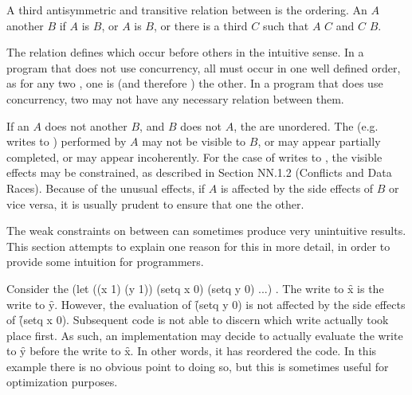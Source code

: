 A third antisymmetric and transitive relation between
 is the  ordering. An
 $A$  another 
$B$ if $A$ is  $B$, or $A$ is
 $B$, or there is a third 
$C$ such that $A$  $C$ and $C$
 $B$.

The  relation defines which 
occur before others in the intuitive sense. In a program that does not
use concurrency, all  must occur in one well defined
order, as for any two , one is
 (and therefore ) the
other. In a program that does use concurrency, two 
may not have any necessary  relation between
them.

If an  $A$ does not  another
 $B$, and $B$ does not  $A$, the
 are unordered. The  (e.g. writes
to ) performed by $A$ may not be visible to $B$, or may
appear partially completed, or may appear incoherently. For the case
of writes to , the visible effects may be constrained, as
described in Section NN.1.2 (Conflicts and Data Races). Because of the
unusual effects, if $A$ is affected by the side effects of $B$ or vice
versa, it is usually prudent to ensure that one 
the other.


The weak constraints on  between  can
sometimes produce very unintuitive results. This section attempts to
explain one reason for this in more detail, in order to provide some
intuition for programmers.

Consider the 
\code
(let ((x 1) (y 1)) (setq x 0) (setq y 0) ...)
\endcode.
The write to \f{x} is  the write to
\f{y}. However, the evaluation of \f{(setq y 0)} is not affected by
the side effects of \f{(setq x 0)}. Subsequent code  is not able to discern which write actually took
place first. As such, an implementation may decide to actually
evaluate the write to \f{y} before the write to \f{x}. In other words,
it has reordered the code. In this example there is no obvious point
to doing so, but this is sometimes useful for optimization purposes.

